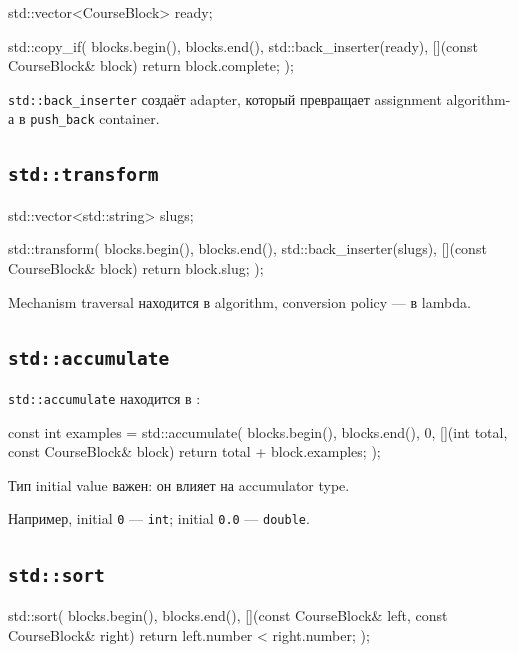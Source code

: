 \begin{cppcode}
std::vector<CourseBlock> ready;

std::copy_if(
    blocks.begin(),
    blocks.end(),
    std::back_inserter(ready),
    [](const CourseBlock& block) {
        return block.complete;
    }
);
\end{cppcode}

\texttt{std::back\_inserter} создаёт adapter, который превращает assignment
algorithm-а в \texttt{push\_back} container.

\subsection{\texttt{std::transform}}

\begin{cppcode}
std::vector<std::string> slugs;

std::transform(
    blocks.begin(),
    blocks.end(),
    std::back_inserter(slugs),
    [](const CourseBlock& block) {
        return block.slug;
    }
);
\end{cppcode}

Mechanism traversal находится в algorithm, conversion policy --- в lambda.

\subsection{\texttt{std::accumulate}}

\texttt{std::accumulate} находится в :

\begin{cppcode}
const int examples = std::accumulate(
    blocks.begin(),
    blocks.end(),
    0,
    [](int total, const CourseBlock& block) {
        return total + block.examples;
    }
);
\end{cppcode}

Тип initial value важен: он влияет на accumulator type.

Например, initial \texttt{0} --- \texttt{int}; initial \texttt{0.0} ---
\texttt{double}.

\subsection{\texttt{std::sort}}

\begin{cppcode}
std::sort(
    blocks.begin(),
    blocks.end(),
    [](const CourseBlock& left, const CourseBlock& right) {
        return left.number < right.number;
    }
);
\end{cppcode}

